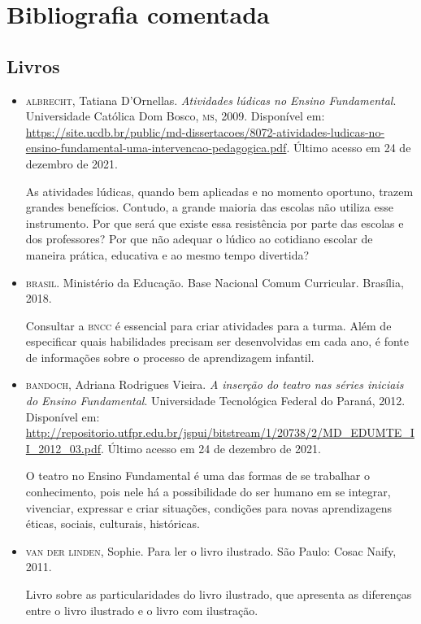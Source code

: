 \documentclass[11pt]{extarticle}
\begin{document}
\section{Bibliografia comentada}

\subsection{Livros}

\begin{itemize}

	\item \textsc{albrecht}, Tatiana D'Ornellas. \textit{Atividades lúdicas no Ensino Fundamental}. Universidade Católica Dom Bosco, \textsc{ms}, 2009. Disponível em: \url{https://site.ucdb.br/public/md-dissertacoes/8072-atividades-ludicas-no-ensino-fundamental-uma-intervencao-pedagogica.pdf}. Último acesso em 24 de dezembro de 2021.

	As atividades lúdicas, quando bem aplicadas e no momento oportuno, trazem
grandes benefícios. Contudo, a grande maioria das escolas não utiliza esse instrumento. Por
que será que existe essa resistência por parte das escolas e dos professores? Por que não
adequar o lúdico ao cotidiano escolar de maneira prática, educativa e ao mesmo tempo
divertida?

\item \textsc{brasil}. Ministério da Educação. Base Nacional Comum Curricular. Brasília, 2018.

Consultar a \textsc{bncc} é essencial para criar atividades para a turma. Além de especificar 
quais habilidades precisam ser desenvolvidas em cada ano, é fonte de informações sobre 
o processo de aprendizagem infantil. 

 \item \textsc{bandoch}, Adriana Rodrigues Vieira. \textit{A inserção do teatro nas séries iniciais do Ensino Fundamental}.
 Universidade Tecnológica Federal do Paraná, 2012. Disponível em: \url{http://repositorio.utfpr.edu.br/jspui/bitstream/1/20738/2/MD_EDUMTE_II_2012_03.pdf}. Último acesso em 24 de dezembro de 2021.

	O teatro no Ensino Fundamental é uma das formas de se trabalhar o conhecimento,
pois nele há a possibilidade do ser humano em se integrar, vivenciar, expressar e
criar situações, condições para novas aprendizagens éticas, sociais, culturais,
históricas.


\item \textsc{van der linden}, Sophie. Para ler o livro ilustrado. São Paulo: Cosac Naify, 2011.

Livro sobre as particularidades do livro ilustrado, que apresenta as diferenças entre o livro ilustrado e o livro com ilustração. 
\end{itemize}
\end{document}
